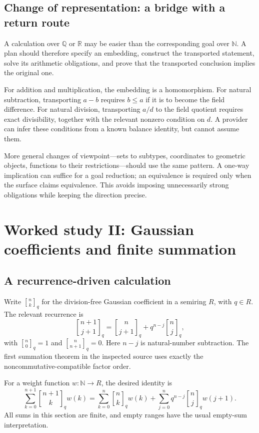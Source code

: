 \documentclass[11pt,a4paper]{article}
\newcommand{\R}{\mathbb R}
\newcommand{\N}{\mathbb N}
\newcommand{\Q}{\mathbb Q}
\newcommand{\G}[2]{\genfrac{[}{]}{0pt}{}{#1}{#2}_{q}}
\theoremstyle{definition}
\theoremstyle{remark}
\numberwithin{equation}{section}
\begin{document}
\subsection{Change of representation: a bridge with a return route}
A calculation over $\Q$ or $\R$ may be easier than the corresponding goal over $\N$. A \texttt{} plan should therefore specify an embedding, construct the transported statement, solve its arithmetic obligations, and prove that the transported conclusion implies the original one.

For addition and multiplication, the embedding is a homomorphism. For natural subtraction, transporting $a-b$ requires $b\le a$ if it is to become the field difference. For natural division, transporting $a/d$ to the field quotient requires exact divisibility, together with the relevant nonzero condition on $d$. A provider can infer these conditions from a known balance identity, but cannot assume them.

More general changes of viewpoint---sets to subtypes, coordinates to geometric objects, functions to their restrictions---should use the same pattern. A one-way implication can suffice for a goal reduction; an equivalence is required only when the surface claims equivalence. This avoids imposing unnecessarily strong obligations while keeping the direction precise.

\section{Worked study II: Gaussian coefficients and finite summation}
\label{sec:qpascal}
\subsection{A recurrence-driven calculation}
Write $\G nk$ for the division-free Gaussian coefficient in a semiring $R$, with $q\in R$. The relevant recurrence is
\begin{equation}\label{eq:qrec}
 \G{n+1}{j+1}=\G n{j+1}+q^{n-j}\G nj,
\end{equation}
with $\G n0=1$ and $\G n{n+1}=0$. Here $n-j$ is natural-number subtraction. The first summation theorem in the inspected source uses exactly the noncommutative-compatible factor order.\cite{p-qpascal}

For a weight function $w:\N\to R$, the desired identity is
\begin{equation}\label{eq:qsum}
 \sum_{k=0}^{n+1}\G{n+1}k w(k)
 =\sum_{k=0}^{n}\G nk w(k)
  +\sum_{j=0}^{n}q^{n-j}\G nj w(j+1).
\end{equation}
All sums in this section are finite, and empty ranges have the usual empty-sum interpretation.
\end{document}
